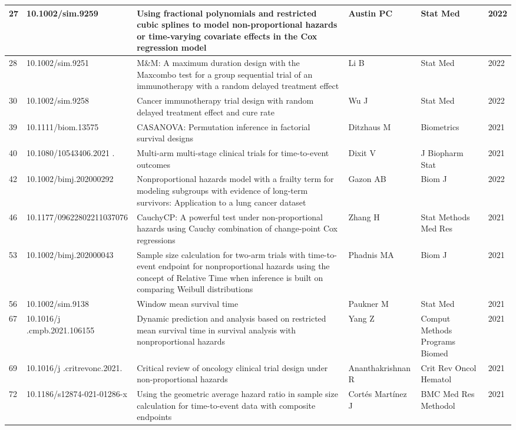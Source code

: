 \begin{landscape}
\begin{longtable}{|p{0.3in}|p{1.8in}|p{2.4in}|p{0.68in}|p{0.89in}|p{0.3in}|}
27 & 10.1002/sim.9259        & Using fractional polynomials and restricted cubic splines to model non-proportional hazards or time-varying covariate effects in the Cox regression model & Austin PC & Stat Med & 2022 \\ \hline 
28 & 10.1002/sim.9251       & M\&M: A maximum duration design with the Maxcombo test for a group sequential trial of an immunotherapy with a random delayed treatment effect & Li B & Stat Med & 2022 \\ \hline 
30 & 10.1002/sim.9258       & Cancer immunotherapy trial design with random delayed treatment effect and cure rate & Wu J & Stat Med & 2022 \\ \hline 
39 & 10.1111/biom.13575      & CASANOVA: Permutation inference in factorial survival designs & Ditzhaus M & Biometrics & 2021 \\ \hline 
40 & 10.1080/10543406.2021      .\-1979575 & Multi-arm multi-stage clinical trials for time-to-event outcomes & Dixit V & J Biopharm Stat & 2021 \\ \hline 
42 & 10.1002/bimj.202000292       & Nonproportional hazards model with a frailty term for modeling subgroups with evidence of long-term survivors: Application to a lung cancer dataset & Gazon AB & Biom J & 2022 \\ \hline 
46 & 10.1177/09622802211037076       & CauchyCP: A powerful test under non-proportional hazards using Cauchy combination of change-point Cox regressions & Zhang H & Stat Methods Med Res & 2021 \\ \hline 
53 & 10.1002/bimj.202000043      & Sample size calculation for two-arm trials with time-to-event endpoint for nonproportional hazards using the concept of Relative Time when inference is built on comparing Weibull distributions & Phadnis MA & Biom J & 2021 \\ \hline 
56 & 10.1002/sim.9138      & Window mean survival time & Paukner M & Stat Med & 2021 \\ \hline 
67 & 10.1016/j     .cmpb.2021.106155 & Dynamic prediction and analysis based on restricted mean survival time in survival analysis with nonproportional hazards & Yang Z & Comput Methods Programs Biomed & 2021 \\ \hline 
69 & 10.1016/j    .critrevonc.2021.\-103350 & Critical review of oncology clinical trial design under non-proportional hazards & Anantha\-krishnan R & Crit Rev Oncol Hematol & 2021 \\ \hline 
72 & 10.1186/s12874-021-01286-x        & Using the geometric average hazard ratio in sample size calculation for time-to-event data with composite endpoints & Cort\'{e}s Mart\'{i}nez J & BMC Med Res Methodol & 2021 \\ \hline 

\end{longtable}
\end{landscape}
